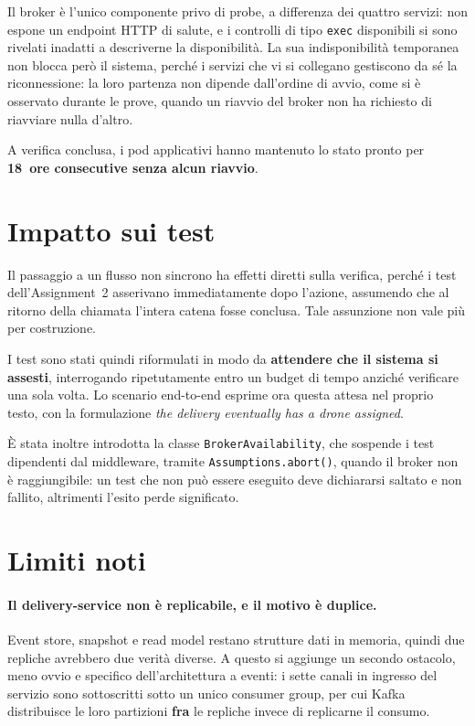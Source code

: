 \documentclass[12pt,a4paper]{article}
\begin{document}
Il broker \`e l'unico componente privo di probe, a differenza dei quattro servizi: non espone un
endpoint HTTP di salute, e i controlli di tipo \texttt{exec} disponibili si sono rivelati inadatti a
descriverne la disponibilit\`a. La sua indisponibilit\`a temporanea non blocca per\`o il sistema,
perch\'e i servizi che vi si collegano gestiscono da s\'e la riconnessione: la loro partenza non
dipende dall'ordine di avvio, come si \`e osservato durante le prove, quando un riavvio del broker
non ha richiesto di riavviare nulla d'altro.

A verifica conclusa, i pod applicativi hanno mantenuto lo stato pronto per \textbf{18~ore
consecutive senza alcun riavvio}.

\section{Impatto sui test}

Il passaggio a un flusso non sincrono ha effetti diretti sulla verifica, perch\'e i test
dell'Assignment~2 asserivano immediatamente dopo l'azione, assumendo che al ritorno della chiamata
l'intera catena fosse conclusa. Tale assunzione non vale pi\`u per costruzione.

I test sono stati quindi riformulati in modo da \textbf{attendere che il sistema si assesti},
interrogando ripetutamente entro un budget di tempo anzich\'e verificare una sola volta. Lo scenario
end-to-end esprime ora questa attesa nel proprio testo, con la formulazione \emph{the delivery
eventually has a drone assigned}.

\`E stata inoltre introdotta la classe \texttt{BrokerAvailability}, che sospende i test dipendenti
dal middleware, tramite \texttt{Assumptions.abort()}, quando il broker non \`e raggiungibile: un test
che non pu\`o essere eseguito deve dichiararsi saltato e non fallito, altrimenti l'esito perde
significato.

\section{Limiti noti}

\paragraph{Il delivery-service non \`e replicabile, e il motivo \`e duplice.} Event store, snapshot
e read model restano strutture dati in memoria, quindi due repliche avrebbero due verit\`a diverse.
A questo si aggiunge un secondo ostacolo, meno ovvio e specifico dell'architettura a eventi: i sette
canali in ingresso del servizio sono sottoscritti sotto un unico consumer group, per cui Kafka
distribuisce le loro partizioni \textbf{fra} le repliche invece di replicarne il consumo.
\end{document}

